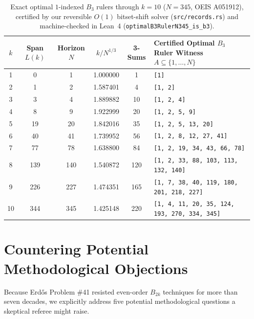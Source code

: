 \documentclass[11pt,a4paper]{article}
\theoremstyle{remark}
\begin{document}
\begin{table}[htbp]
  \centering
  \footnotesize
  \caption{Exact optimal $1$-indexed $B_3$ rulers through $k = 10$ ($N = 345$, OEIS A051912), certified by our reversible $O(1)$ bitset-shift solver (\texttt{src/records.rs}) and machine-checked in Lean~4 (\texttt{optimalB3RulerN345\_is\_b3}).}
  \begin{tabular}{cccccl}
    \toprule
    $k$ & Span $L(k)$ & Horizon $N$ & $k/N^{1/3}$ & 3-Sums & Certified Optimal $B_3$ Ruler Witness $A \subseteq \{1, \dots, N\}$ \\
    \midrule
    1 & 0 & 1 & 1.000000 & 1 & \texttt{[1]} \\
    2 & 1 & 2 & 1.587401 & 4 & \texttt{[1, 2]} \\
    3 & 3 & 4 & 1.889882 & 10 & \texttt{[1, 2, 4]} \\
    4 & 8 & 9 & 1.922999 & 20 & \texttt{[1, 2, 5, 9]} \\
    5 & 19 & 20 & 1.842016 & 35 & \texttt{[1, 2, 5, 13, 20]} \\
    6 & 40 & 41 & 1.739952 & 56 & \texttt{[1, 2, 8, 12, 27, 41]} \\
    7 & 77 & 78 & 1.638800 & 84 & \texttt{[1, 2, 19, 34, 43, 66, 78]} \\
    8 & 139 & 140 & 1.540872 & 120 & \texttt{[1, 2, 33, 88, 103, 113, 132, 140]} \\
    9 & 226 & 227 & 1.474351 & 165 & \texttt{[1, 7, 38, 40, 119, 180, 201, 218, 227]} \\
    10 & 344 & 345 & 1.425148 & 220 & \texttt{[1, 4, 11, 20, 35, 124, 193, 270, 334, 345]} \\
    \bottomrule
  \end{tabular}
  \label{tab:rulers}
\end{table}

\section{Countering Potential Methodological Objections}

Because Erd\H{o}s Problem \#41 resisted even-order $B_{2k}$ techniques for more than seven decades, we explicitly address five potential methodological questions a skeptical referee might raise.
\end{document}
